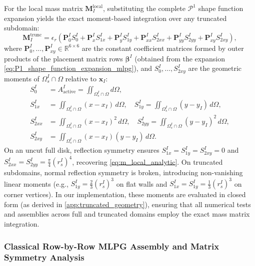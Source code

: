 \documentclass[VANCOUVER,Times1COL]{WileyNJD-v5}
\begin{document}
For the local mass matrix $\mathbf{M}_I^{\mathrm{local}}$, substituting the complete $\mathcal{P}^1$ shape function expansion yields the exact moment-based integration over any truncated subdomain:
\begin{equation}
    \mathbf{M}_I^{\mathrm{trunc}} = \epsilon_r \left( \mathbf{P}_0^I S_0^I + \mathbf{P}_x^I S_{1x}^I + \mathbf{P}_y^I S_{1y}^I + \mathbf{P}_{xx}^I S_{2xx}^I + \mathbf{P}_{yy}^I S_{2yy}^I + \mathbf{P}_{xy}^I S_{2xy}^I \right),
    \label{eq:m_truncated_moments}
\end{equation}
where $\mathbf{P}_0^I, \dots, \mathbf{P}_{xy}^I \in \mathbb{R}^{6 \times 6}$ are the constant coefficient matrices formed by outer products of the placement matrix rows $\boldsymbol{\beta}^I$ (obtained from the expansion \eqref{eq:P1_shape_function_expansion_mlpg}), and $S_0^I, \dots, S_{2xy}^I$ are the geometric moments of $\Omega_s^I \cap \Omega$ relative to $\mathbf{x}_I$:
\begin{align}
    S_0^I     & = A_{\mathrm{active}}^I = \iint_{\Omega_s^I \cap \Omega} d\Omega,                                                                 \\
    S_{1x}^I  & = \iint_{\Omega_s^I \cap \Omega} (x - x_I) \, d\Omega, \quad S_{1y}^I = \iint_{\Omega_s^I \cap \Omega} (y - y_I) \, d\Omega,      \\
    S_{2xx}^I & = \iint_{\Omega_s^I \cap \Omega} (x - x_I)^2 \, d\Omega, \quad S_{2yy}^I = \iint_{\Omega_s^I \cap \Omega} (y - y_I)^2 \, d\Omega, \\
    S_{2xy}^I & = \iint_{\Omega_s^I \cap \Omega} (x - x_I)(y - y_I) \, d\Omega.
\end{align}
On an uncut full disk, reflection symmetry ensures $S_{1x}^I = S_{1y}^I = S_{2xy}^I = 0$ and $S_{2xx}^I = S_{2yy}^I = \frac{\pi}{4}(r_s^I)^4$, recovering \eqref{eq:m_local_analytic}. On truncated subdomains, normal reflection symmetry is broken, introducing non-vanishing linear moments (e.g., $S_{1y}^I = \frac{2}{3}(r_s^I)^3$ on flat walls and $S_{1x}^I = S_{1y}^I = \frac{1}{3}(r_s^I)^3$ on corner vertices). In our implementation, these moments are evaluated in closed form (as derived in \ref{app:truncated_geometry}), ensuring that all numerical tests and assemblies across full and truncated domains employ the exact mass matrix integration.

\subsubsection{Classical Row-by-Row MLPG Assembly and Matrix Symmetry Analysis}
\label{subsubsec:row_mlpg_symmetry}
\end{document}
